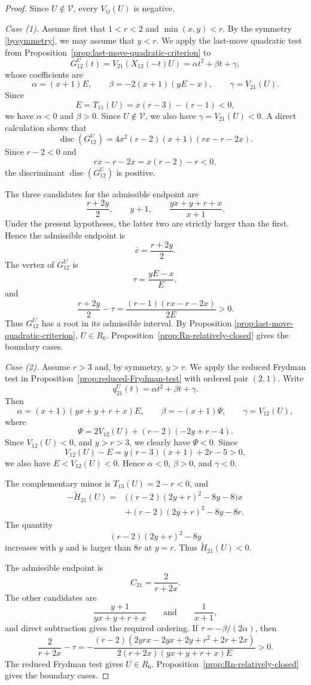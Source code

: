 \documentclass[10pt,a4paper]{amsart}
\newcommand{\V}{\mathcal V}
\newcommand{\disc}{\operatorname{disc}}
\begin{document}
\begin{proof}
Since $U\notin\V$, every $V_{ij}(U)$ is negative.

\smallskip
\noindent
\emph{Case (1).}
Assume first that $1<r<2$ and $\min(x,y)<r$. By the symmetry \eqref{bysymmetry}, we may assume that $y<r$. We apply the
last-move quadratic test from
Proposition~\ref{prop:last-move-quadratic-criterion} to
\[
G_{12}^U(t)=V_{21}(X_{12}(-t)U)=\alpha t^2+\beta t+\gamma,
\]
whose coefficients are
\[
\alpha=(x+1)E,
\qquad
\beta=-2(x+1)(yE-x),
\qquad
\gamma=V_{21}(U).
\]
Since 
\[
E=T_{11}(U)=x(r-3)-(r-1)<0,
\]
we have  $\alpha<0$ and $\beta>0$. Since $U\notin \V$, we also have $\gamma=V_{21}(U)<0$.
A direct calculation shows that
\[
\disc(G_{12}^U)
=4x^2(r-2)(x+1)(rx-r-2x).
\]
Since $r-2<0$ and
\[
rx-r-2x=x(r-2)-r<0,
\]
the discriminant $\disc(G_{12}^U)$ is positive.

The three candidates for the admissible endpoint are
\[
\frac{r+2y}{2},
\qquad
y+1,
\qquad
\frac{yx+y+r+x}{x+1}.
\]
Under the present hypotheses, the latter two are strictly larger than the first.
Hence the admissible endpoint is
\[
\bar c=\frac{r+2y}{2}.
\]
The vertex of $G_{12}^U$ is
\[
\tau=\frac{yE-x}{E},
\]
and
\[
\frac{r+2y}{2}-\tau
=\frac{(r-1)(rx-r-2x)}{2E}>0.
\]
Thus $G_{12}^U$ has a root in its admissible interval. By Proposition \ref{prop:last-move-quadratic-criterion}, $U\in R_6$. Proposition~\ref{prop:Rn-relatively-closed} gives the
boundary cases.


\smallskip
\noindent
\emph{Case (2).}
Assume $r>3$ and, by symmetry, $y>r$. We apply the reduced Frydman test
in Proposition~\ref{prop:reduced-Frydman-test} with ordered pair
$(2,1)$. Write
\[
q_{21}^U(t)=\alpha t^2+\beta t+\gamma.
\]
Then
\[
\alpha=(x+1)(yx+y+r+x)E,
\qquad
\beta=-(x+1)\Psi,
\qquad
\gamma=V_{12}(U),
\]
where
\[
\Psi=2V_{12}(U)+(r-2)(-2y+r-4).
\]
Since $V_{12}(U)<0$, and $y>r>3$, we clearly have $\Psi<0$.
Since
\[
V_{12}(U)-E=y(r-3)(x+1)+2r-5>0,
\]
we also have $E<V_{12}(U)<0$. Hence $\alpha<0$, $\beta>0$, and $\gamma<0$.

The complementary minor is $T_{13}(U)=2-r<0$, and
\[
\begin{aligned}
-\widetilde H_{21}(U)={}&\bigl((r-2)(2y+r)^2-8y-8\bigr)x\\
&+(r-2)(2y+r)^2-8y-8r.
\end{aligned}
\]
The quantity
\[
(r-2)(2y+r)^2-8y
\]
increases with $y$ and is larger than
$8r$ at $y=r$.  Thus $\widetilde H_{21}(U)<0$.

The admissible endpoint is
\[
C_{21}=\frac{2}{r+2x}.
\]
The other candidates are
\[
\frac{y+1}{yx+y+r+x}
\qquad\text{and}\qquad
\frac{1}{x+1},
\]
and direct subtraction gives the required ordering. If
$\tau=-\beta/(2\alpha)$, then
\[
\frac2{r+2x}-\tau
=-\frac{(r-2)(2yrx-2yx+2y+r^2+2r+2x)}
{2(r+2x)(yx+y+r+x)E}>0.
\]
The reduced Frydman test gives $U\in R_6$.
Proposition~\ref{prop:Rn-relatively-closed} gives the boundary cases.


\end{proof}
\end{document}
